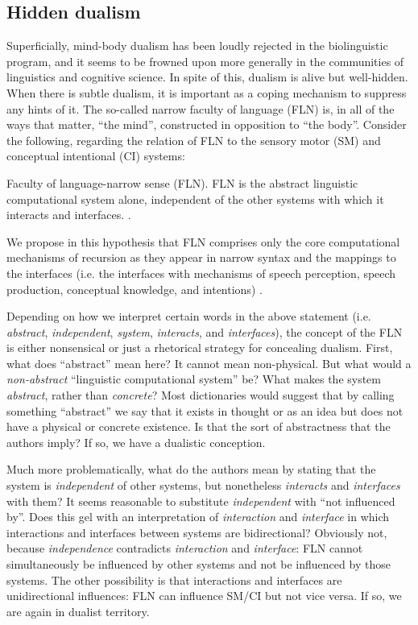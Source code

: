 \subsection{Hidden dualism}

Superficially, mind-body dualism has been loudly rejected in the biolinguistic program, and it seems to be frowned upon more generally in the communities of linguistics and cognitive science. In spite of this, dualism is alive but well-hidden. When there is subtle dualism, it is important as a coping mechanism to suppress any hints of it. The so-called narrow faculty of language (FLN) is, in all of the ways that matter, “the mind”, constructed in opposition to “the body”. Consider the following, regarding the relation of FLN to the sensory motor (SM) and conceptual intentional (CI) systems:

Faculty of language-narrow sense (FLN). FLN is the abstract linguistic computational system alone, independent of the other systems with which it interacts and interfaces. \citep{HauserEtAl2002}.

We   propose   in   this   hypothesis   that   FLN   comprises   only   the   core computational  mechanisms  of  recursion  as  they  appear  in  narrow  syntax  and  the mappings  to  the  interfaces (i.e.  the  interfaces  with  mechanisms  of  speech  perception, speech  production,  conceptual  knowledge,  and  intentions) \citep{HauserEtAl2002}.

  Depending on how we interpret certain words in the above statement (i.e. \textit{abstract}, \textit{independent}, \textit{system}, \textit{interacts}, and \textit{interfaces}), the concept of the FLN is either nonsensical or just a rhetorical strategy for concealing dualism. First, what does “abstract” mean here? It cannot mean non-physical. But what would a \textit{non-abstract} “linguistic computational system” be? What makes the system \textit{abstract}, rather than \textit{concrete}? Most dictionaries would suggest that by calling something “abstract” we say that it exists in thought or as an idea but does not have a physical or concrete existence. Is that the sort of abstractness that the authors imply? If so, we have a dualistic conception. 

  Much more problematically, what do the authors mean by stating that the system is \textit{independent} of other systems, but nonetheless \textit{interacts} and \textit{interfaces} with them? It seems reasonable to substitute \textit{independent} with “not influenced by”. Does this gel with an interpretation of \textit{interaction} and \textit{interface} in which interactions and interfaces between systems are bidirectional? Obviously not, because \textit{independence} contradicts \textit{interaction} and \textit{interface}: FLN cannot simultaneously be influenced by other systems and not be influenced by those systems. The other possibility is that interactions and interfaces are unidirectional influences: FLN can influence SM/CI but not vice versa. If so, we are again in dualist territory. 

